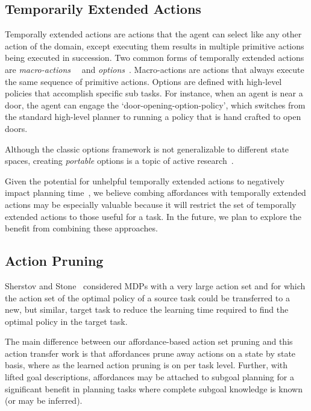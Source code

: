 \documentclass[conference]{IEEEtran}
\begin{document}
\subsection{Temporarily Extended Actions}
Temporally extended actions are actions that the agent can
select like any other action of the domain, except executing them
results in multiple primitive actions being executed in
succession. Two common forms of temporally extended actions are {\em
  macro-actions}~\citep{hauskrecht98} ~and {\em options}~\citep{sutton99}. 
Macro-actions are actions that always
execute the same sequence of primitive actions. Options are defined
with high-level policies that accomplish specific sub tasks. For
instance, when an agent is near a door, the agent can engage the
`door-opening-option-policy', which switches from the standard
high-level planner to running a policy that is hand crafted to open
doors. 

Although the classic options framework is not generalizable to different state spaces,
creating {\em portable} options is a topic of active research~\citep{konidaris07,konidaris2009efficient,Ravindran03analgebraic,croonenborghs2008learning,andre2002state,konidaris2012transfer}.

Given the potential for unhelpful temporally extended actions to negatively impact planning time~\citep{Jong:2008zr}, we believe combing affordances with temporally extended actions
may be especially valuable because it will restrict the set of temporally extended actions to those
useful for a task. In the future, we plan to explore the benefit from combining
these approaches.

\subsection{Action Pruning}

Sherstov and Stone~\citep{sherstov2005improving} considered MDPs with a very large action set and for which the action
set of the optimal policy of a source task could be transferred to a new, but similar, target
task to reduce the learning time required to find the optimal policy in the target task.

The main difference between our affordance-based action set pruning and this action transfer
work is that affordances prune away actions on a state by state basis, where
as the learned action pruning is on per task level. Further, with lifted goal descriptions, affordances may be attached to subgoal planning for a significant
benefit in planning tasks where complete subgoal knowledge is known (or may be inferred).
\end{document}
